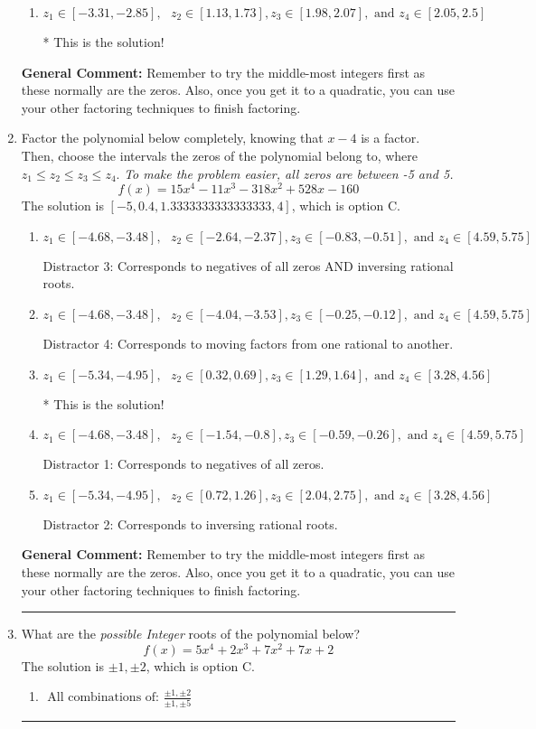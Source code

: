 \documentclass{extbook}[14pt]
\newcommand{\litem}[1]{\item #1

\rule{\textwidth}{0.4pt}}
\begin{document}
\begin{enumerate}
{\begin{enumerate}[label=\Alph*.]
 Distractor 3: Corresponds to negatives of all zeros AND inversing rational roots.
\item \( z_1 \in [-3.31, -2.85], \text{   }  z_2 \in [1.13, 1.73], z_3 \in [1.98, 2.07], \text{   and   } z_4 \in [2.05, 2.5] \)

* This is the solution!
\end{enumerate}

\textbf{General Comment:} Remember to try the middle-most integers first as these normally are the zeros. Also, once you get it to a quadratic, you can use your other factoring techniques to finish factoring.
}
\litem{
Factor the polynomial below completely, knowing that $x-4$ is a factor. Then, choose the intervals the zeros of the polynomial belong to, where $z_1 \leq z_2 \leq z_3 \leq z_4$. \textit{To make the problem easier, all zeros are between -5 and 5.}
\[ f(x) = 15x^{4} -11 x^{3} -318 x^{2} +528 x -160 \]The solution is \( [-5, 0.4, 1.3333333333333333, 4] \), which is option C.\begin{enumerate}[label=\Alph*.]
\item \( z_1 \in [-4.68, -3.48], \text{   }  z_2 \in [-2.64, -2.37], z_3 \in [-0.83, -0.51], \text{   and   } z_4 \in [4.59, 5.75] \)

 Distractor 3: Corresponds to negatives of all zeros AND inversing rational roots.
\item \( z_1 \in [-4.68, -3.48], \text{   }  z_2 \in [-4.04, -3.53], z_3 \in [-0.25, -0.12], \text{   and   } z_4 \in [4.59, 5.75] \)

 Distractor 4: Corresponds to moving factors from one rational to another.
\item \( z_1 \in [-5.34, -4.95], \text{   }  z_2 \in [0.32, 0.69], z_3 \in [1.29, 1.64], \text{   and   } z_4 \in [3.28, 4.56] \)

* This is the solution!
\item \( z_1 \in [-4.68, -3.48], \text{   }  z_2 \in [-1.54, -0.8], z_3 \in [-0.59, -0.26], \text{   and   } z_4 \in [4.59, 5.75] \)

 Distractor 1: Corresponds to negatives of all zeros.
\item \( z_1 \in [-5.34, -4.95], \text{   }  z_2 \in [0.72, 1.26], z_3 \in [2.04, 2.75], \text{   and   } z_4 \in [3.28, 4.56] \)

 Distractor 2: Corresponds to inversing rational roots.
\end{enumerate}

\textbf{General Comment:} Remember to try the middle-most integers first as these normally are the zeros. Also, once you get it to a quadratic, you can use your other factoring techniques to finish factoring.
}
\litem{
What are the \textit{possible Integer} roots of the polynomial below?
\[ f(x) = 5x^{4} +2 x^{3} +7 x^{2} +7 x + 2 \]The solution is \( \pm 1,\pm 2 \), which is option C.\begin{enumerate}[label=\Alph*.]
\item \( \text{ All combinations of: }\frac{\pm 1,\pm 2}{\pm 1,\pm 5} \)


\end{enumerate}}
\end{enumerate}
\end{document}
